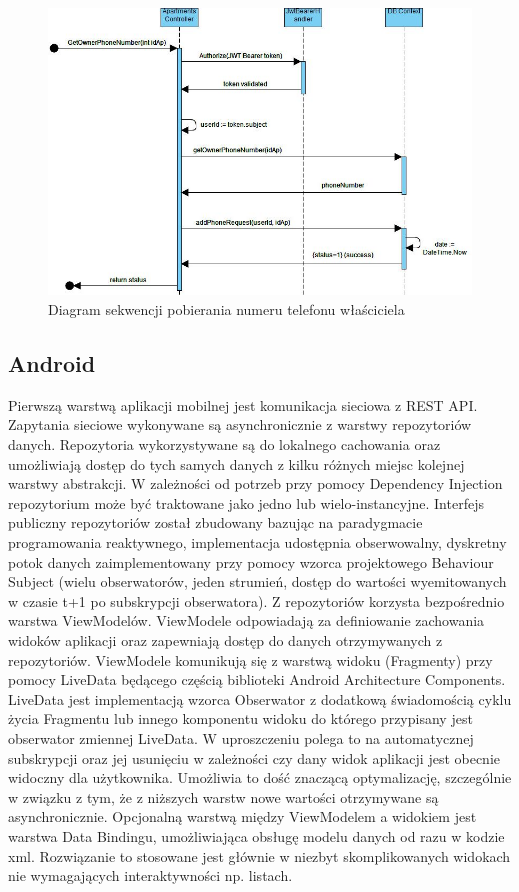 \documentclass[polish, 11pt]{article}
\begin{document}
        \begin{figure}[H]
            \centering
            \includegraphics[width=\textwidth]{figures/getPhoneSeq.jpg}
            \caption{Diagram sekwencji pobierania numeru telefonu właściciela}
        \end{figure}
    
    \subsection{Android}
    
    Pierwszą warstwą aplikacji mobilnej jest komunikacja sieciowa z REST API. Zapytania sieciowe wykonywane są asynchronicznie z warstwy repozytoriów danych. Repozytoria wykorzystywane są do lokalnego cachowania oraz umożliwiają dostęp do tych samych danych z kilku różnych miejsc kolejnej warstwy abstrakcji. W zależności od potrzeb przy pomocy Dependency Injection repozytorium może być traktowane jako jedno lub wielo-instancyjne. Interfejs publiczny repozytoriów został zbudowany bazując na paradygmacie programowania reaktywnego, implementacja udostępnia obserwowalny, dyskretny potok danych zaimplementowany przy pomocy wzorca projektowego Behaviour Subject (wielu obserwatorów, jeden strumień, dostęp do wartości wyemitowanych w czasie t+1 po subskrypcji obserwatora). Z repozytoriów korzysta bezpośrednio warstwa ViewModelów. ViewModele odpowiadają za definiowanie zachowania widoków aplikacji oraz zapewniają dostęp do danych otrzymywanych z repozytoriów.
    ViewModele komunikują się z warstwą widoku (Fragmenty) przy pomocy LiveData będącego częścią biblioteki Android Architecture Components. LiveData jest implementacją wzorca Obserwator z dodatkową świadomością cyklu życia Fragmentu lub innego komponentu widoku do którego przypisany jest obserwator zmiennej LiveData. W uproszczeniu polega to na automatycznej subskrypcji oraz jej usunięciu w zależności czy dany widok aplikacji jest obecnie widoczny dla użytkownika. Umożliwia to dość znaczącą optymalizację, szczególnie w związku z tym, że z niższych warstw nowe wartości otrzymywane są asynchronicznie. Opcjonalną warstwą między ViewModelem a widokiem jest warstwa Data Bindingu, umożliwiająca obsługę modelu danych od razu w kodzie xml. Rozwiązanie to stosowane jest głównie w niezbyt skomplikowanych widokach nie wymagających interaktywności np. listach.     
        
\end{document}
